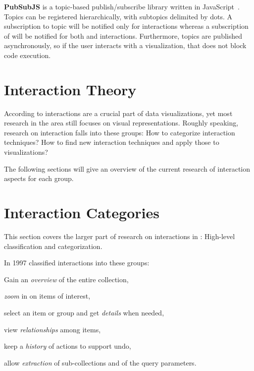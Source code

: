 \textbf{PubSubJS} is a topic-based publish/subscribe library written in JavaScript~\cite{PubSubJS2017}.
Topics can be registered hierarchically, with subtopics delimited by dots.
A subscription to topic  will be notified only for  interactions whereas a subscription of  will be notified for both  and  interactions.
Furthermore, topics are published asynchronously, so if the user interacts with a visualization, that does not block code execution.




\section{Interaction Theory}\label{sec:related-work:interaction-theory}
According to \textcite{Ho2013} interactions are a crucial part of data visualizations, yet most research in the area still focuses on visual representations.
Roughly speaking, research on interaction falls into these groups:
How to categorize interaction techniques?
How to find new interaction techniques and apply those to visualizations?

The following sections will give an overview of the current research of interaction aspects for each group.

\section{Interaction Categories}\label{sec:related-work:interaction-theory:categories}
This section covers the larger part of research on interactions in \cmvs{}:
High-level classification and categorization.

In 1997 \textcite{Shneiderman1996} classified interactions into these groups:
\begin{enumerate*}[label=(\arabic*)]
  \item
    Gain an \emph{overview} of the entire collection,
  \item
    \emph{zoom} in on items of interest,
  \item
    select an item or group and get \emph{details} when needed,
  \item
    view \emph{relationships} among items,
  \item
    keep a \emph{history} of actions to support undo,
  \item
    allow \emph{extraction} of sub-collections and of the query parameters.
\end{enumerate*}

